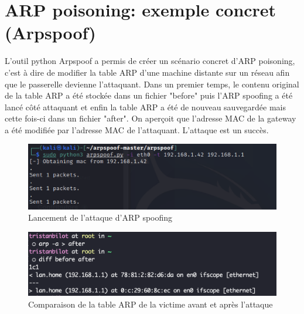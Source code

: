 \documentclass[12pt, oneside]{article}
\begin{document}
\section{ARP poisoning: exemple concret (Arpspoof)}
L'outil python Arpspoof a permis de créer un scénario concret d'ARP poisoning, c'est à dire de modifier la table ARP d'une machine distante sur un réseau afin que le passerelle devienne l'attaquant. Dans un premier temps, le contenu original de la table ARP a été stockée dans un fichier "before" puis l'ARP spoofing a été lancé côté attaquant et enfin la table ARP a été de nouveau sauvegardée mais cette fois-ci dans un fichier "after". On aperçoit que l'adresse MAC de la gateway a été modifiée par l'adresse MAC de l'attaquant. L'attaque est un succès. 
\begin{figure}[H]
\centering
\includegraphics[scale=0.4]{arpspoof2}
\caption{Lancement de l'attaque d'ARP spoofing}
\end{figure}
\begin{figure}[H]
\centering
\includegraphics[scale=0.4]{arpspoof}
\caption{Comparaison de la table ARP de la victime avant et après l'attaque}
\end{figure}
\end{document}
